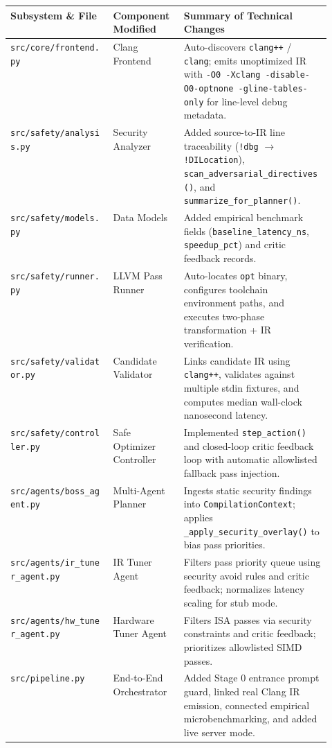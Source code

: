 \documentclass[11pt]{article}
\begin{document}
\begin{table}[h]
\centering
\small
\begin{tabularx}{\linewidth}{@{}p{0.32\linewidth}p{0.22\linewidth}Y@{}}
\toprule
\textbf{Subsystem \& File} & \textbf{Component Modified} & \textbf{Summary of Technical Changes} \\
\midrule
\texttt{src/core/frontend.py} & Clang Frontend & Auto-discovers \texttt{clang++} / \texttt{clang}; emits unoptimized IR with \texttt{-O0 -Xclang -disable-O0-optnone -gline-tables-only} for line-level debug metadata. \\
\texttt{src/safety/analysis.py} & Security Analyzer & Added source-to-IR line traceability (\texttt{!dbg} $\rightarrow$ \texttt{!DILocation}), \texttt{scan\_adversarial\_directives()}, and \texttt{summarize\_for\_planner()}. \\
\texttt{src/safety/models.py} & Data Models & Added empirical benchmark fields (\texttt{baseline\_latency\_ns}, \texttt{speedup\_pct}) and critic feedback records. \\
\texttt{src/safety/runner.py} & LLVM Pass Runner & Auto-locates \texttt{opt} binary, configures toolchain environment paths, and executes two-phase transformation + IR verification. \\
\texttt{src/safety/validator.py} & Candidate Validator & Links candidate IR using \texttt{clang++}, validates against multiple stdin fixtures, and computes median wall-clock nanosecond latency. \\
\texttt{src/safety/controller.py} & Safe Optimizer Controller & Implemented \texttt{step\_action()} and closed-loop critic feedback loop with automatic allowlisted fallback pass injection. \\
\texttt{src/agents/boss\_agent.py} & Multi-Agent Planner & Ingests static security findings into \texttt{CompilationContext}; applies \texttt{\_apply\_security\_overlay()} to bias pass priorities. \\
\texttt{src/agents/ir\_tuner\_agent.py} & IR Tuner Agent & Filters pass priority queue using security avoid rules and critic feedback; normalizes latency scaling for stub mode. \\
\texttt{src/agents/hw\_tuner\_agent.py} & Hardware Tuner Agent & Filters ISA passes via security constraints and critic feedback; prioritizes allowlisted SIMD passes. \\
\texttt{src/pipeline.py} & End-to-End Orchestrator & Added Stage 0 entrance prompt guard, linked real Clang IR emission, connected empirical microbenchmarking, and added live server mode. \\

\end{tabularx}
\end{table}
\end{document}
